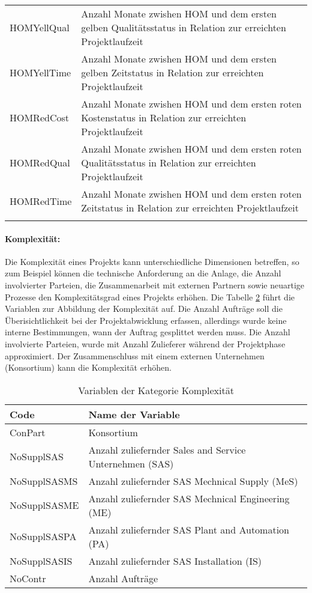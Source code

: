 \begin{longtable}[ht]{p{}p{}}
		HOMYellQual & Anzahl Monate zwishen HOM und dem ersten gelben Qualitätsstatus in Relation zur erreichten Projektlaufzeit \\
		HOMYellTime & Anzahl Monate zwishen HOM und dem ersten gelben Zeitstatus in Relation zur erreichten Projektlaufzeit \\
		HOMRedCost & Anzahl Monate zwishen HOM und dem ersten roten Kostenstatus in Relation zur erreichten Projektlaufzeit \\
		HOMRedQual & Anzahl Monate zwishen HOM und dem ersten roten Qualitätsstatus in Relation zur erreichten Projektlaufzeit \\
		HOMRedTime & Anzahl Monate zwishen HOM und dem ersten roten Zeitstatus in Relation zur erreichten Projektlaufzeit \\
		\bottomrule
	\label{tab:ffvar}%
\end{longtable}%
\paragraph{Komplexität:} Die Komplexität eines Projekts kann unterschiedliche Dimensionen betreffen, so zum Beispiel können die technische Anforderung an die Anlage, die Anzahl involvierter Parteien, die Zusammenarbeit mit externen Partnern sowie neuartige Prozesse den Komplexitätsgrad eines Projekts erhöhen. Die Tabelle \ref{tab:covar} führt die Variablen zur Abbildung der Komplexität auf. Die Anzahl Aufträge soll die Überisichtlichkeit bei der Projektabwicklung erfassen, allerdings wurde keine interne Bestimmungen, wann der Auftrag gesplittet werden muss. Die Anzahl involvierte Parteien, wurde mit Anzahl Zulieferer während der Projektphase approximiert. Der Zusammenschluss mit einem externen Unternehmen (Konsortium) kann die Komplexität erhöhen.
\begin{table}[htbp]
	\centering
	\caption{Variablen der Kategorie Komplexität}
	\begin{tabular}{ll}
		\toprule
		\textbf{Code} & \textbf{Name der Variable} \\
		\midrule
		ConPart & Konsortium \\
		NoSupplSAS & Anzahl zuliefernder Sales and Service Unternehmen (SAS) \\
		NoSupplSASMS & Anzahl zuliefernder SAS Mechnical Supply (MeS) \\
		NoSupplSASME & Anzahl zuliefernder SAS Mechnical Engineering (ME) \\
		NoSupplSASPA & Anzahl zuliefernder SAS Plant and Automation (PA) \\
		NoSupplSASIS & Anzahl zuliefernder SAS Installation (IS) \\
		NoContr & Anzahl Aufträge \\
		\bottomrule
	\end{tabular}%
	\label{tab:covar}%
\end{table}%

